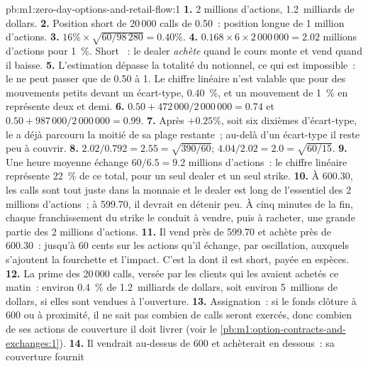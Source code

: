 \begin{solution}{pb:m1:zero-day-options-and-retail-flow:1}
\textbf{1.} 2 millions d'actions, 1.2~milliards de dollars.
\textbf{2.} Position short de 20\,000 calls de  0.50~: position longue de 1 million d'actions.
\textbf{3.} $16\% \times \sqrt{60/98\,280} = 0.40\%$.
\textbf{4.} $0.168 \times 6 \times 2\,000\,000 = 2.02$ millions d'actions pour 1~\%.
Short ~: le dealer \emph{achète} quand le cours monte et vend quand il baisse.
\textbf{5.} L'estimation dépasse la totalité du notionnel, ce qui est impossible~: le  ne peut
passer que de 0.50 à 1. Le chiffre linéaire n'est valable que pour des mouvements petits devant
un écart-type, 0.40~\%, et un mouvement de 1~\% en représente deux et demi.
\textbf{6.} $0.50 + 472\,000/2\,000\,000 = 0.74$ et $0.50 + 987\,000/2\,000\,000 =
0.99$.
\textbf{7.} Après $+0.25\%$, soit six dixièmes d'écart-type, le  a
déjà parcouru la moitié de sa plage restante~; au-delà d'un écart-type
il reste peu à couvrir.
\textbf{8.} $2.02/0.792 = 2.55 = \sqrt{390/60}$; $4.04/2.02 = 2.0 =
\sqrt{60/15}$.
\textbf{9.} Une heure moyenne échange $60/6.5 = 9.2$ millions d'actions~: le chiffre
linéaire représente 22~\% de ce total, pour un seul dealer et un seul strike.
\textbf{10.} À 600.30, les calls sont tout juste dans la monnaie et le dealer est long de
l'essentiel des 2 millions d'actions~; à 599.70, il devrait en détenir peu. À cinq
minutes de la fin, chaque franchissement du strike le conduit à vendre, puis à racheter, une
grande partie des 2 millions d'actions.
\textbf{11.} Il vend près de 599.70 et achète près de 600.30~: jusqu'à 60 cents sur les
actions qu'il échange, par oscillation, auxquels s'ajoutent la fourchette et l'impact. C'est la
 dont il est short, payée en espèces.
\textbf{12.} La prime des 20\,000 calls, versée par les clients qui
les avaient achetés ce matin~: environ 0.4~\% de 1.2~milliards de dollars, soit environ 5~millions de dollars, si elles sont vendues à
l'ouverture.
\textbf{13.} Assignation~: si le fonds clôture à 600 ou à proximité, il ne sait pas
combien de calls seront exercés, donc combien de ses actions de couverture il doit
livrer (voir le \cref{pb:m1:option-contracts-and-exchanges:1}).
\textbf{14.} Il vendrait au-dessus de 600 et achèterait en dessous~: sa couverture fournit

\end{solution}
